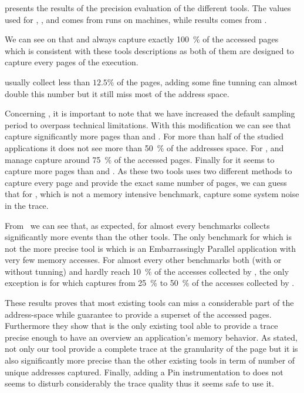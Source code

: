  presents the results of the precision evaluation of the
different tools. The values used for \Mitos, \MitosTun, \Moca and
\TABARNAC comes from runs on \Edel machines, while \MemProf results comes from
\Idfreeze.

We can see on  that \Moca and \TABARNAC always capture exactly
\SI{100}{\%} of the accessed pages which is consistent with these tools
descriptions as both of them are designed to capture every pages of the
execution.

\Mitos usually collect less than $12.5\%$ of the pages, adding some fine tunning
can almost double this number but it still miss most of the address space.

Concerning \MemProf, it is important to note that we have increased the
default sampling period to overpass technical limitations. With this
modification we can see that \MemProf capture significantly more pages than
\Mitos and \MitosTun. For more than half of the studied applications it does
not see more than \SI{50}{\%} of the addresses space. For \BT, \LU and \UA
\MemProf manage capture around \SI{75}{\%} of the accessed pages. Finally for
\SP it seems to capture more pages than \TABARNAC and \Moca. As these two
tools uses two different methods to capture every page and provide the exact
same number of pages, we can guess that for \SP, which is not a memory
intensive benchmark, \MemProf capture some system noise in the trace.

From  we can see that, as expected, for almost every benchmarks
\Moca collects significantly more events than the other tools.  The only
benchmark for which \Moca is not the more precise tool is \EP which is an
Embarrassingly Parallel application with very few memory accesses.  For almost
every other benchmarks both \Mitos (with or without tunning) and \MemProf
hardly reach \SI{10}{\%} of the accesses collected by \Moca, the only exception is
\CG for which \MemProf captures from \SI{25}{\%} to \SI{50}{\%} of the accesses
collected by \Moca.

These results proves that most existing tools can miss a considerable part of
the address-space while \Moca guarantee to provide a superset of the accessed
pages. Furthermore they show that \Moca is the only existing tool able to provide a
trace precise enough to have an overview an application's memory behavior. As
stated, not only our tool provide a complete trace at the granularity of the
page but it is also significantly more precise than the other existing tools in term of
number of unique addresses captured. Finally, adding a Pin instrumentation to
\Moca does not seems to disturb considerably the trace quality thus it seems
safe to use it.

